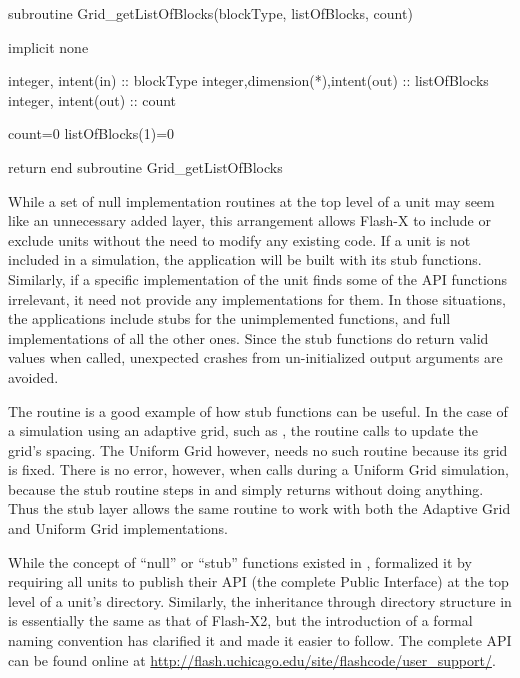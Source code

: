\begin{shrink}
\begin{codeseg}
subroutine Grid_getListOfBlocks(blockType, listOfBlocks, count)

  implicit none

  integer, intent(in) :: blockType
  integer,dimension(*),intent(out) :: listOfBlocks
  integer, intent(out) :: count

  count=0
  listOfBlocks(1)=0

  return
end subroutine Grid_getListOfBlocks
\end{codeseg}
\end{shrink}

While a set of null implementation routines at the top level of
a unit may seem like an unnecessary added layer, this arrangement
allows Flash-X to include or exclude units without the need to modify any
existing code.  If a unit is not included in a simulation, the
application will be built with its stub functions. Similarly, if a
specific implementation of the unit finds some of the API functions
irrelevant, it need not provide any implementations for them.
In those situations, the applications include stubs for the
unimplemented functions, and full implementations of all the other
ones. Since the stub functions do return valid values when called,
unexpected crashes from un-initialized output arguments are avoided.

The  routine is a good example of how
stub functions can be useful. In the case of a simulation using an
adaptive grid, such as \Paramesh, the routine 
calls  to update the grid's spacing. The Uniform
Grid however, needs no such routine because its grid is fixed.  There is no
error, however, when  calls 
during a Uniform Grid simulation, because the stub routine steps in and simply
returns without doing anything.  Thus the stub layer allows the same
 routine to work with both the Adaptive Grid and
Uniform Grid implementations.


\begin{flashtip}
While the concept of ``null'' or ``stub'' functions existed in
\flashx, \flashx formalized it by requiring all units to 
publish their API (the complete Public Interface) at the top level of a
unit's directory. Similarly, the inheritance through \OS directory
structure in \flashx is essentially the same as that of Flash-X2,
but the introduction of a formal naming convention has clarified it
and made it easier to follow.
The complete API can be found online at \newline
\url{http://flash.uchicago.edu/site/flashcode/user_support/}.
\end{flashtip}

